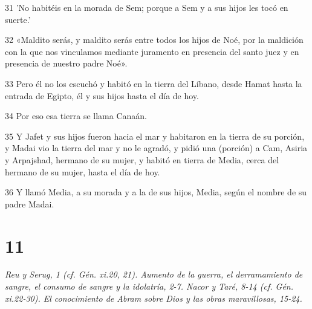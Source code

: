 \par 31 'No habitéis en la morada de Sem; porque a Sem y a sus hijos les tocó en suerte.'
\par 32 «Maldito serás, y maldito serás entre todos los hijos de Noé, por la maldición con la que nos vinculamos mediante juramento en presencia del santo juez y en presencia de nuestro padre Noé».
\par 33 Pero él no los escuchó y habitó en la tierra del Líbano, desde Hamat hasta la entrada de Egipto, él y sus hijos hasta el día de hoy.
\par 34 Por eso esa tierra se llama Canaán.
\par 35 Y Jafet y sus hijos fueron hacia el mar y habitaron en la tierra de su porción, y Madai vio la tierra del mar y no le agradó, y pidió una (porción) a Cam, Asiria y Arpajshad, hermano de su mujer, y habitó en tierra de Media, cerca del hermano de su mujer, hasta el día de hoy.
\par 36 Y llamó Media, a su morada y a la de sus hijos, Media, según el nombre de su padre Madai.

\chapter{11}

\par \textit{Reu y Serug, 1 (cf. Gén. xi.20, 21). Aumento de la guerra, el derramamiento de sangre, el consumo de sangre y la idolatría, 2-7. Nacor y Taré, 8-14 (cf. Gén. xi.22-30). El conocimiento de Abram sobre Dios y las obras maravillosas, 15-24.}

